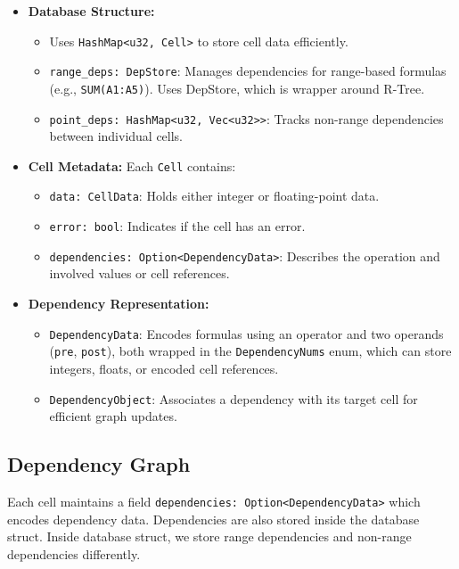 \documentclass[12pt]{article}
\begin{document}
\begin{itemize}
  \item \textbf{Database Structure:}
  \begin{itemize}
    \item Uses \texttt{HashMap<u32, Cell>} to store cell data efficiently.
    \item \texttt{range\_deps: DepStore}: Manages dependencies for range-based formulas (e.g., \texttt{SUM(A1:A5)}). Uses DepStore, which is wrapper around R-Tree.
    \item \texttt{point\_deps: HashMap<u32, Vec<u32>>}: Tracks non-range dependencies between individual cells.
  \end{itemize}

  \item \textbf{Cell Metadata:} Each \texttt{Cell} contains:
  \begin{itemize}
    \item \texttt{data: CellData}: Holds either integer or floating-point data.
    \item \texttt{error: bool}: Indicates if the cell has an error.
    \item \texttt{dependencies: Option<DependencyData>}: Describes the operation and involved values or cell references.
  \end{itemize}

  \item \textbf{Dependency Representation:}
  \begin{itemize}
    \item \texttt{DependencyData}: Encodes formulas using an operator and two operands (\texttt{pre}, \texttt{post}), both wrapped in the \texttt{DependencyNums} enum, which can store integers, floats, or encoded cell references.
    \item \texttt{DependencyObject}: Associates a dependency with its target cell for efficient graph updates.
  \end{itemize}
\end{itemize}

\subsection{Dependency Graph}
Each cell maintains a field \texttt{dependencies: Option<DependencyData>} which encodes dependency data. Dependencies are also stored inside the database struct. Inside database struct, we store range dependencies and non-range dependencies differently.
\end{document}
